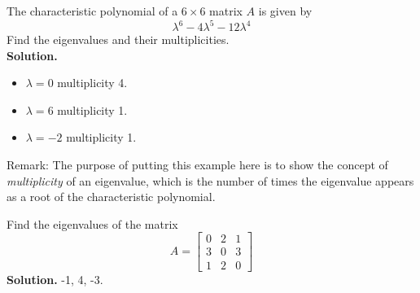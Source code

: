 \documentclass[10pt, a4paper]{article}
\begin{document}
\begin{example}
    The characteristic polynomial of a $6 \times 6$ matrix $A$ is given by \[
    \lambda^6-4\lambda^5-12\lambda^4
    \]
    Find the eigenvalues and their multiplicities.\\
    \textbf{Solution.} 
    \begin{itemize}
        \item $\lambda=0$\; multiplicity 4.
        \item $\lambda=6$\; multiplicity 1.
        \item $\lambda=-2$ multiplicity 1.
    \end{itemize}
\end{example}
\indent Remark: The purpose of putting this example here is to show the concept of \textit{multiplicity} of an eigenvalue, which is the number of times the eigenvalue appears as a root of the characteristic polynomial.
\begin{example}
    Find the eigenvalues of the matrix \[
    A = \begin{bmatrix}
        0&2&1\\
        3&0&3\\
        1&2&0
    \end{bmatrix}
    \]
    \textbf{Solution.} -1, 4, -3.
\end{example}
\end{document}
